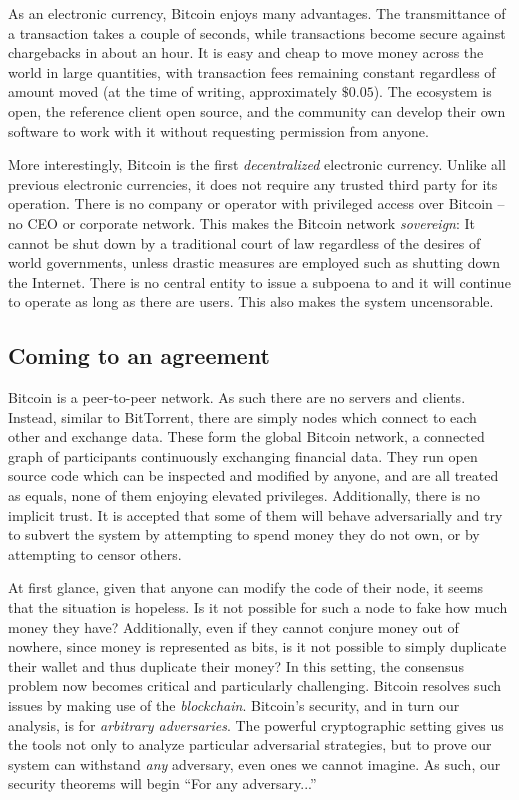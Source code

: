 As an electronic currency, Bitcoin enjoys many advantages. The transmittance of
a transaction takes a couple of seconds, while transactions become secure
against chargebacks in about an hour. It is easy and cheap to move money across
the world in large quantities, with transaction fees remaining constant
regardless of amount moved (at the time of writing, approximately $\$0.05$). The
ecosystem is open, the reference client open source, and the community can
develop their own software to work with it without requesting permission from
anyone.

More interestingly, Bitcoin is the first \emph{decentralized} electronic
currency. Unlike all previous electronic currencies, it does not require any
trusted third party for its operation. There is no company or operator with
privileged access over Bitcoin -- no CEO or corporate network. This makes
the Bitcoin network \emph{sovereign}: It cannot be shut down by a traditional
court of law regardless of the desires of world governments, unless drastic
measures are employed such as shutting down the Internet. There is no central
entity to issue a subpoena to and it will continue to operate as long as there
are users. This also makes the system uncensorable.

\subsection{Coming to an agreement}
Bitcoin is a peer-to-peer network. As such there are no servers and clients.
Instead, similar to BitTorrent, there are simply nodes which connect to each
other and exchange data. These form the global Bitcoin network, a connected
graph of participants continuously exchanging financial data. They run open
source code which can be inspected and modified by anyone, and are all
treated as equals, none of them enjoying elevated privileges. Additionally, there
is no implicit trust. It is accepted that some of them will behave adversarially
and try to subvert the system by attempting to spend money they do not own,
or by attempting to censor others.

At first glance, given that anyone can modify the code of their node, it seems
that the situation is hopeless. Is it not possible for such a node to fake how
much money they have? Additionally, even if they cannot conjure money out of
nowhere, since money is represented as bits, is it not possible to simply
duplicate their wallet and thus duplicate their money? In this setting, the
consensus problem now becomes critical and particularly challenging. Bitcoin
resolves such issues by making use of the \emph{blockchain}.
Bitcoin's security, and in turn our analysis, is for \emph{arbitrary
adversaries}. The powerful cryptographic setting gives us the tools not only to
analyze particular adversarial strategies, but to prove our system can withstand
\emph{any} adversary, even ones we cannot imagine. As such, our security
theorems will begin ``For any adversary...''

